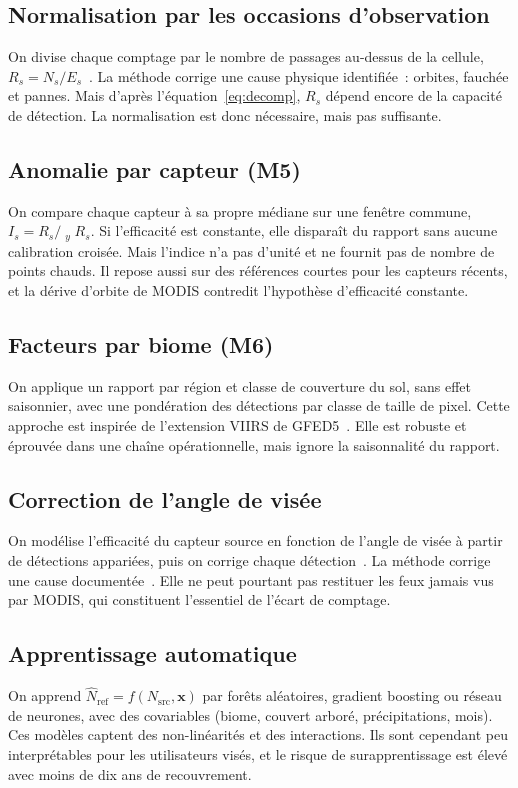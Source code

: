 \documentclass[11pt,a4paper]{article}
\DeclareMathOperator{\med}{m\acute{e}d}
\begin{document}
\subsection{Normalisation par les occasions d'observation}
On divise chaque comptage par le nombre de passages au-dessus de la cellule, $R_s = N_s/E_s$~\cite{giglio2006,kaiser2012}. La méthode corrige une cause physique identifiée~: orbites, fauchée et pannes. Mais d'après l'équation~\eqref{eq:decomp}, $R_s$ dépend encore de la capacité de détection. La normalisation est donc nécessaire, mais pas suffisante.

\subsection{Anomalie par capteur (M5)}
On compare chaque capteur à sa propre médiane sur une fenêtre commune, $I_s = R_s/\med_y R_s$. Si l'efficacité est constante, elle disparaît du rapport sans aucune calibration croisée. Mais l'indice n'a pas d'unité et ne fournit pas de nombre de points chauds. Il repose aussi sur des références courtes pour les capteurs récents, et la dérive d'orbite de MODIS contredit l'hypothèse d'efficacité constante.

\subsection{Facteurs par biome (M6)}
On applique un rapport par région et classe de couverture du sol, sans effet saisonnier, avec une pondération des détections par classe de taille de pixel. Cette approche est inspirée de l'extension VIIRS de GFED5~\cite{chen2026}. Elle est robuste et éprouvée dans une chaîne opérationnelle, mais ignore la saisonnalité du rapport.

\subsection{Correction de l'angle de visée}
On modélise l'efficacité du capteur source en fonction de l'angle de visée à partir de détections appariées, puis on corrige chaque détection~\cite{zheng2026}. La méthode corrige une cause documentée~\cite{li2018}. Elle ne peut pourtant pas restituer les feux jamais vus par MODIS, qui constituent l'essentiel de l'écart de comptage.

\subsection{Apprentissage automatique}
On apprend $\hat N_{\text{ref}} = f(N_{\text{src}}, \mathbf{x})$ par forêts aléatoires, gradient boosting ou réseau de neurones, avec des covariables (biome, couvert arboré, précipitations, mois). Ces modèles captent des non-linéarités et des interactions. Ils sont cependant peu interprétables pour les utilisateurs visés, et le risque de surapprentissage est élevé avec moins de dix ans de recouvrement.
\end{document}
